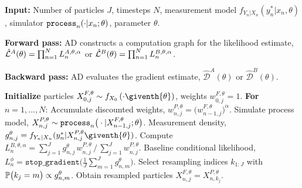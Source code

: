 \begin{algorithm}[htbp!]
	\caption{}
    \label{alg:dmop}
	     \textbf{Input:} Number of particles $J$, timesteps $N$, measurement model $f_{Y_n|X_n}(y_n^*|x_n, \theta)$, simulator $\process_n(\cdot|x_n; \theta)$, parameter $\theta$.
      
             \textbf{Forward pass:} AD constructs a computation graph for the likelihood estimate, $\hat{\mathcal{L}}^A(\theta) = \prod_{n=1}^N L_n^{A,\theta,\alpha}$ or $\hat{\mathcal{L}}^B(\theta) = \prod_{n=1}^N L_n^{B,\theta,\alpha}$. 
            
        \textbf{Backward pass:} AD evaluates the gradient estimate, $\hat{\mathcal{D}}^A(\theta)$ or  $\hat{\mathcal{D}}^B(\theta)$.
            
		\textbf{Initialize } particles ${X}_{0,j}^{F,\theta}\sim {f}_{{X}_{0}}\left(\cdot\giventh{\theta}\right)$, weights $w^{F,\theta}_{0,j}= 1$. \newline
		\textbf{For} $n=1,...,N$: \newline
            \hspace*{4mm} Accumulate discounted weights, $w_{n,j}^{P,\theta} = \big(w_{n-1,j}^{F,\theta}\big)^\alpha$.\newline
            \hspace*{4mm} Simulate process model,
            ${X}_{n,j}^{P,\theta}\sim \process_n\big(\cdot|{X}_{n-1,j}^{F, \theta};{\theta}\big)$. \newline
            \hspace*{4mm} Measurement density,
            $g^{\theta}_{n,j}={f}_{{Y}_{n}|{X}_{n}}(y_{n}^{*}|{X}_{n,j}^{P,\theta}\giventh{\theta})$. \newline
            \hspace*{4mm} Compute $L_n^{B,\theta,\alpha} ={\sum_{j=1}^Jg^\theta_{n,j} \, w^{P,\theta}_{n,j}}\, \big/\, {\sum_{j=1}^J  w^{P,\theta}_{n,j}}$. \newline
            \hspace*{4mm} Baseline conditional likelihood,
            $L_n^{\phi} = \mathtt{stop\_gradient}\big(\frac{1}{J}\sum_{m=1}^{J}g^{\theta}_{n,m}\big)$.\newline
            \hspace*{4mm} Select resampling indices $k_{1:J}$ with ${\mathbb{P}}\big(k_{j}=m\big) \propto g^{\theta}_{n,m}$. \newline
            \hspace*{4mm} Obtain resampled particles ${X}_{n,j}^{F,\theta}={X}_{n,k_{j}}^{P,\theta}$. \newline

\end{algorithm}
